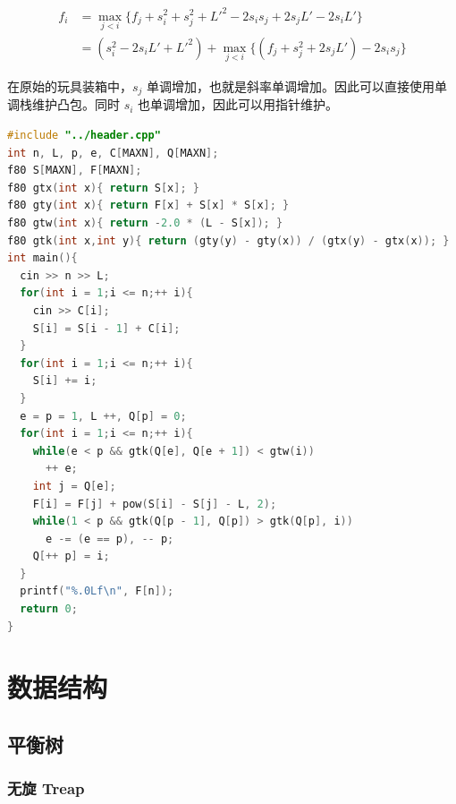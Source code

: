 \documentclass[10pt]{ctexart}
\begin{document}
\begin{multicols}{3}
    \[
    \begin{aligned}
    f_i &= \max_{j<i}\{f_j+s_i^2+s_j^2+L'^2-2s_is_j+2s_jL'-2s_iL' \} \\
    &= (s_i^2 -2s_iL'+ L'^2) + \max_{j<i}\{(f_j+s_j^2+2s_jL') -2s_is_j \}
    \end{aligned}
    \]

    在原始的玩具装箱中，\(s_j\)
    单调增加，也就是斜率单调增加。因此可以直接使用单调栈维护凸包。同时
    \(s_i\) 也单调增加，因此可以用指针维护。

\begin{lstlisting}[language={C++}]
#include "../header.cpp"
int n, L, p, e, C[MAXN], Q[MAXN];
f80 S[MAXN], F[MAXN];
f80 gtx(int x){ return S[x]; }
f80 gty(int x){ return F[x] + S[x] * S[x]; }
f80 gtw(int x){ return -2.0 * (L - S[x]); }
f80 gtk(int x,int y){ return (gty(y) - gty(x)) / (gtx(y) - gtx(x)); }
int main(){ 
  cin >> n >> L;
  for(int i = 1;i <= n;++ i){
    cin >> C[i];
    S[i] = S[i - 1] + C[i];
  }
  for(int i = 1;i <= n;++ i){
    S[i] += i;
  }
  e = p = 1, L ++, Q[p] = 0;
  for(int i = 1;i <= n;++ i){
    while(e < p && gtk(Q[e], Q[e + 1]) < gtw(i))
      ++ e;
    int j = Q[e];
    F[i] = F[j] + pow(S[i] - S[j] - L, 2);
    while(1 < p && gtk(Q[p - 1], Q[p]) > gtk(Q[p], i))
      e -= (e == p), -- p;
    Q[++ p] = i;
  }
  printf("%.0Lf\n", F[n]);
  return 0;
}
\end{lstlisting}

    \section{数据结构}\label{ux6570ux636eux7ed3ux6784}

    \subsection{平衡树}\label{ux5e73ux8861ux6811}

    \subsubsection{无旋 Treap}\label{ux65e0ux65cb-treap}


\end{multicols}
\end{document}
